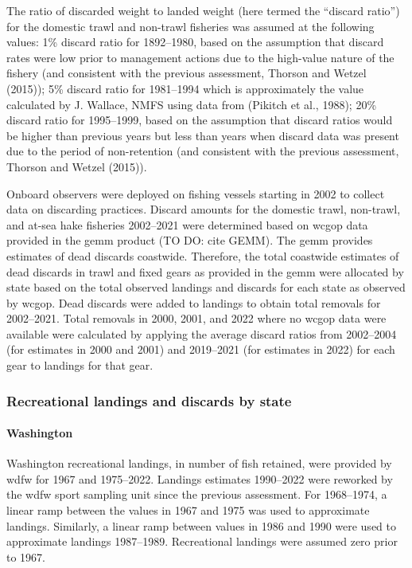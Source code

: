 \documentclass[11pt,
  english,
  letterpaper,
]{article}
\begin{document}
The ratio of discarded weight to landed weight (here termed the ``discard ratio'') for the domestic trawl and non-trawl fisheries was assumed at the following values: 1\% discard ratio for 1892--1980, based on the assumption that discard rates were low prior to management actions due to the high-value nature of the fishery (and consistent with the previous assessment, Thorson and Wetzel (2015)); 5\% discard ratio for 1981--1994 which is approximately the value calculated by J. Wallace, NMFS using data from (Pikitch et al., 1988); 20\% discard ratio for 1995--1999, based on the assumption that discard ratios would be higher than previous years but less than years when discard data was present due to the period of non-retention (and consistent with the previous assessment, Thorson and Wetzel (2015)).

Onboard observers were deployed on fishing vessels starting in 2002 to collect data on discarding practices. Discard amounts for the domestic trawl, non-trawl, and at-sea hake fisheries 2002--2021 were determined based on \gls{wcgop} data provided in the \gls{gemm} product (TO DO: cite GEMM). The \gls{gemm} provides estimates of dead discards coastwide. Therefore, the total coastwide estimates of dead discards in trawl and fixed gears as provided in the \gls{gemm} were allocated by state based on the total observed landings and discards for each state as observed by \gls{wcgop}. Dead discards were added to landings to obtain total removals for 2002--2021. Total removals in 2000, 2001, and 2022 where no \gls{wcgop} data were available were calculated by applying the average discard ratios from 2002--2004 (for estimates in 2000 and 2001) and 2019--2021 (for estimates in 2022) for each gear to landings for that gear.

\hypertarget{recreational-landings-and-discards-by-state}{%
\subsubsection{Recreational landings and discards by state}\label{recreational-landings-and-discards-by-state}}

\hypertarget{washington-1}{%
\paragraph{Washington}\label{washington-1}}

Washington recreational landings, in number of fish retained, were provided by \gls{wdfw} for 1967 and 1975--2022. Landings estimates 1990--2022 were reworked by the \gls{wdfw} sport sampling unit since the previous assessment. For 1968--1974, a linear ramp between the values in 1967 and 1975 was used to approximate landings. Similarly, a linear ramp between values in 1986 and 1990 were used to approximate landings 1987--1989. Recreational landings were assumed zero prior to 1967.
\end{document}
